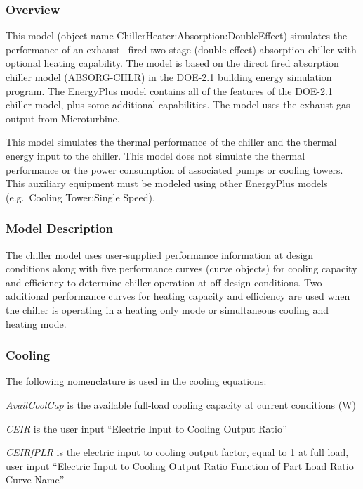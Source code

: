 \subsubsection{Overview}\label{overview-1-003}

This model (object name ChillerHeater:Absorption:DoubleEffect) simulates the performance of an exhaust~ fired two-stage (double effect) absorption chiller with optional heating capability. The model is based on the direct fired absorption chiller model (ABSORG-CHLR) in the DOE-2.1 building energy simulation program. The EnergyPlus model contains all of the features of the DOE-2.1 chiller model, plus some additional capabilities. The model uses the exhaust gas output from Microturbine.

This model simulates the thermal performance of the chiller and the thermal energy input to the chiller. This model does not simulate the thermal performance or the power consumption of associated pumps or cooling towers. This auxiliary equipment must be modeled using other EnergyPlus models (e.g.~Cooling Tower:Single Speed).

\subsubsection{Model Description}\label{model-description-1-003}

The chiller model uses user-supplied performance information at design conditions along with five performance curves (curve objects) for cooling capacity and efficiency to determine chiller operation at off-design conditions. Two additional performance curves for heating capacity and efficiency are used when the chiller is operating in a heating only mode or simultaneous cooling and heating mode.

\subsubsection{Cooling}\label{cooling-1}

The following nomenclature is used in the cooling equations:

\emph{AvailCoolCap} is the available full-load cooling capacity at current conditions (W)

\emph{CEIR} is the user input ``Electric Input to Cooling Output Ratio''

\emph{CEIRfPLR} is the electric input to cooling output factor, equal to 1 at full load, user input ``Electric Input to Cooling Output Ratio Function of Part Load Ratio Curve Name''

